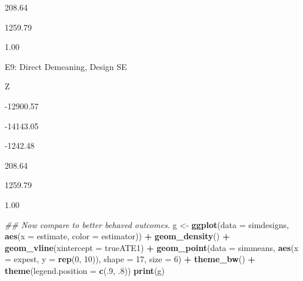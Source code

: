 \documentclass[
  12pt,
]{book}
\newenvironment{Shaded}{\begin{snugshade}}{\end{snugshade}}
\newcommand{\CommentTok}[1]{\textcolor[rgb]{0.56,0.35,0.01}{\textit{#1}}}
\newcommand{\DataTypeTok}[1]{\textcolor[rgb]{0.13,0.29,0.53}{#1}}
\newcommand{\DecValTok}[1]{\textcolor[rgb]{0.00,0.00,0.81}{#1}}
\newcommand{\FloatTok}[1]{\textcolor[rgb]{0.00,0.00,0.81}{#1}}
\newcommand{\KeywordTok}[1]{\textcolor[rgb]{0.13,0.29,0.53}{\textbf{#1}}}
\newcommand{\NormalTok}[1]{#1}
\newcommand{\OperatorTok}[1]{\textcolor[rgb]{0.81,0.36,0.00}{\textbf{#1}}}
\newcommand{\StringTok}[1]{\textcolor[rgb]{0.31,0.60,0.02}{#1}}
\theoremstyle{definition}
\theoremstyle{definition}
\theoremstyle{definition}
\theoremstyle{remark}
\begin{document}
208.64

1259.79

1.00

E9: Direct Demeaning, Design SE

Z

-12900.57

-14143.05

-1242.48

208.64

1259.79

1.00

\begin{Shaded}
\end{Shaded}

\begin{Shaded}
\begin{Highlighting}[]
\CommentTok{## Now compare to better behaved outcomes.}
\NormalTok{g <-}\StringTok{ }\KeywordTok{ggplot}\NormalTok{(}\DataTypeTok{data =}\NormalTok{ simdesigns, }\KeywordTok{aes}\NormalTok{(}\DataTypeTok{x =}\NormalTok{ estimate, }\DataTypeTok{color =}\NormalTok{ estimator)) }\OperatorTok{+}
\StringTok{  }\KeywordTok{geom_density}\NormalTok{() }\OperatorTok{+}
\StringTok{  }\KeywordTok{geom_vline}\NormalTok{(}\DataTypeTok{xintercept =}\NormalTok{ trueATE1) }\OperatorTok{+}
\StringTok{  }\KeywordTok{geom_point}\NormalTok{(}\DataTypeTok{data =}\NormalTok{ simmeans, }\KeywordTok{aes}\NormalTok{(}\DataTypeTok{x =}\NormalTok{ expest, }\DataTypeTok{y =} \KeywordTok{rep}\NormalTok{(}\DecValTok{0}\NormalTok{, }\DecValTok{10}\NormalTok{)), }\DataTypeTok{shape =} \DecValTok{17}\NormalTok{, }\DataTypeTok{size =} \DecValTok{6}\NormalTok{) }\OperatorTok{+}
\StringTok{  }\KeywordTok{theme_bw}\NormalTok{() }\OperatorTok{+}
\StringTok{  }\KeywordTok{theme}\NormalTok{(}\DataTypeTok{legend.position =} \KeywordTok{c}\NormalTok{(.}\DecValTok{9}\NormalTok{, }\FloatTok{.8}\NormalTok{))}
\KeywordTok{print}\NormalTok{(g)}
\end{Highlighting}
\end{Shaded}
\end{document}
